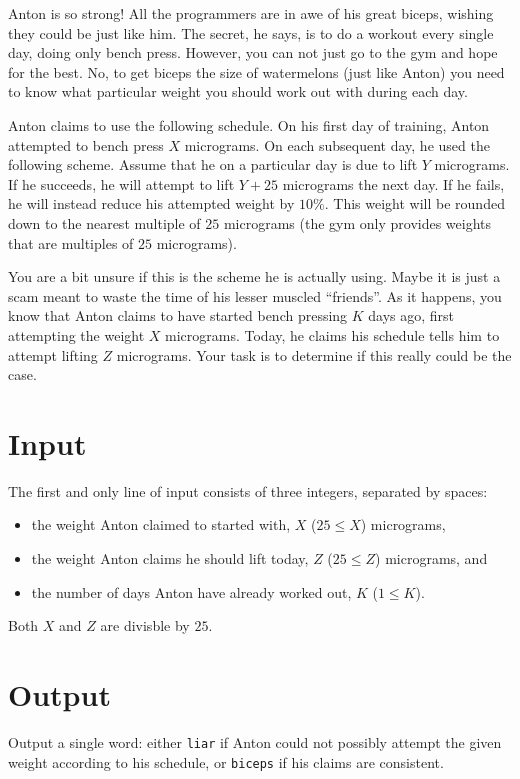 Anton is so strong!
All the programmers are in awe of his great biceps, wishing they could be just like him.
The secret, he says, is to do a workout every single day, doing only bench press.
However, you can not just go to the gym and hope for the best.
No, to get biceps the size of watermelons (just like Anton) you need to know what particular weight you should work out with during each day.

Anton claims to use the following schedule.
On his first day of training, Anton attempted to bench press $X$ micrograms.
On each subsequent day, he used the following scheme.
Assume that he on a particular day is due to lift $Y$ micrograms.
If he succeeds, he will attempt to lift $Y + 25$ micrograms the next day.
If he fails, he will instead reduce his attempted weight by $10\%$.
This weight will be rounded down to the nearest multiple of $25$ micrograms (the gym only provides weights that are multiples of $25$ micrograms).

You are a bit unsure if this is the scheme he is actually using.
Maybe it is just a scam meant to waste the time of his lesser muscled ``friends''.
As it happens, you know that Anton claims to have started bench pressing $K$ days ago, first attempting the weight $X$ micrograms.
Today, he claims his schedule tells him to attempt lifting $Z$ micrograms.
Your task is to determine if this really could be the case.

\section*{Input}
The first and only line of input consists of three integers, separated by spaces:
\begin{itemize}
  \item the weight Anton claimed to started with, $X$ ($25 \le X$) micrograms,
  \item the weight Anton claims he should lift today, $Z$ ($25 \le Z$) micrograms, and
  \item the number of days Anton have already worked out, $K$ ($1 \le K$).
\end{itemize}

Both $X$ and $Z$ are divisble by $25$.

\section*{Output}
Output a single word: either \texttt{liar} if Anton could not possibly attempt the given weight according to his schedule, or \texttt{biceps} if his claims are consistent.

